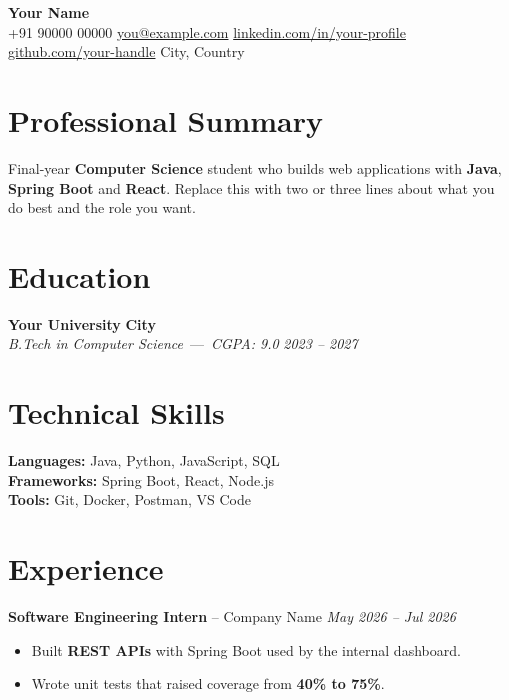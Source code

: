 \documentclass[10pt,a4paper]{article}
\newenvironment{resumebody}{\begin{list}{}{\setlength{\leftmargin}{0.8em}\setlength{\topsep}{0pt}\setlength{\itemsep}{0pt}\setlength{\parsep}{0pt}}\item[]}{\end{list}}
\begin{document}
\begin{center}
{\huge\bfseries\color{accent} Your Name}\\[5pt]
{\small +91 90000 00000 \textbullet{} \href{mailto:you@example.com}{you@example.com} \textbullet{} \href{https://linkedin.com/in/your-profile}{linkedin.com/in/your-profile} \textbullet{} \href{https://github.com/your-handle}{github.com/your-handle} \textbullet{} City, Country}
\end{center}

\section{Professional Summary}
\begin{resumebody}
Final-year \textbf{Computer Science} student who builds web applications with \textbf{Java}, \textbf{Spring Boot} and \textbf{React}. Replace this with two or three lines about what you do best and the role you want.
\end{resumebody}

\section{Education}
\begin{resumebody}
\textbf{Your University} \hfill \textbf{City}\\
\textit{B.Tech in Computer Science} \,---\, \textit{CGPA: 9.0} \hfill \textit{2023 -- 2027}
\end{resumebody}

\section{Technical Skills}
\begin{resumebody}
\textbf{Languages:} Java, Python, JavaScript, SQL\\
\textbf{Frameworks:} Spring Boot, React, Node.js\\
\textbf{Tools:} Git, Docker, Postman, VS Code
\end{resumebody}

\section{Experience}
\begin{resumebody}
  \textbf{Software Engineering Intern} -- Company Name \hfill \textit{May 2026 -- Jul 2026}\\[-9pt]
  \begin{itemize}
    \item Built \textbf{REST APIs} with Spring Boot used by the internal dashboard.
    \item Wrote unit tests that raised coverage from \textbf{40\% to 75\%}.
  \end{itemize}
  \vspace{3pt}
\end{resumebody}
\end{document}
